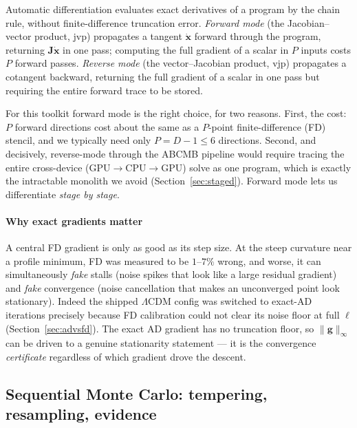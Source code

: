 \documentclass[11pt]{article}
\newcommand{\ginf}{\lVert \bm{g}\rVert_\infty}
\begin{document}
Automatic differentiation evaluates exact derivatives of a program by
the chain rule, without finite-difference truncation error.
\emph{Forward mode} (the Jacobian--vector product, jvp) propagates a
tangent $\dot{\bm x}$ forward through the program, returning
$\bm J\dot{\bm x}$ in one pass; computing the full gradient of a
scalar in $P$ inputs costs $P$ forward passes. \emph{Reverse mode} (the
vector--Jacobian product, vjp) propagates a cotangent backward, returning
the full gradient of a scalar in one pass but requiring the entire
forward trace to be stored.

For this toolkit forward mode is the right choice, for two reasons.
First, the cost: $P$ forward directions cost about the same as a $P$-point
finite-difference (FD) stencil, and we typically need only $P=D-1\le6$
directions. Second, and decisively, reverse-mode through the
\textsc{ABCMB} pipeline would require tracing the entire cross-device
(GPU$\to$CPU$\to$GPU) solve as one program, which is exactly the
intractable monolith we avoid (Section~\ref{sec:staged}). Forward mode
lets us differentiate \emph{stage by stage}.

\paragraph{Why exact gradients matter}
A central FD gradient is only as good as its step size. At the steep
curvature near a profile minimum, FD was measured to be $1$--$7\%$ wrong,
and worse, it can simultaneously \emph{fake} stalls (noise spikes that
look like a large residual gradient) and \emph{fake} convergence (noise
cancellation that makes an unconverged point look stationary). Indeed the
shipped $\Lambda$CDM config was switched to exact-AD iterations precisely
because FD calibration could not clear its noise floor at full $\ell$
(Section~\ref{sec:advsfd}). The exact AD gradient has no truncation floor,
so $\ginf$ can be driven to a genuine stationarity statement --- it is the
convergence \emph{certificate} regardless of which gradient drove the
descent.

\subsection{Sequential Monte Carlo: tempering, resampling, evidence}
\label{sec:smcbg}
\end{document}
